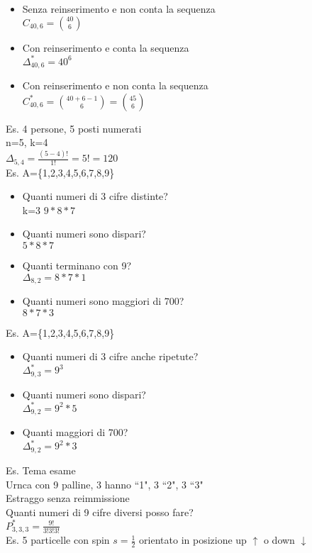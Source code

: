 \documentclass{report}
\begin{document}
\begin{itemize}
\begin{itemize}
      \item Senza reinserimento e non conta la sequenza\\$C_{40,6} = \binom{40}{6}$
      \item Con reinserimento e conta la sequenza\\$\Delta_{40,6}^* = 40^6$
      \item Con reinserimento e non conta la sequenza\\$C_{40,6}^* = \binom{40+6-1}{6}=\binom{45}{6}$
    \end{itemize}
    Es. 4 persone, 5 posti numerati\\
    n=5, k=4\\
    $\Delta_{5,4}=\frac{(5-4)!}{1!} = 5! = 120$\\
    Es. A=\{1,2,3,4,5,6,7,8,9\} \\
    \begin{itemize}
      \item Quanti numeri di 3 cifre distinte?\\k=3 $9*8*7$
      \item Quanti numeri sono dispari?\\$5*8*7$
      \item Quanti terminano con 9?\\$\Delta_{8,2}=8*7*1$
      \item Quanti numeri sono maggiori di 700?\\$8*7*3$
    \end{itemize}
    Es. A=\{1,2,3,4,5,6,7,8,9\}
    \begin{itemize}
      \item Quanti numeri di 3 cifre anche ripetute?\\$\Delta_{9,3}^* = 9^3$
      \item Quanti numeri sono dispari?\\$\Delta_{9,2}^* = 9^2*5$
      \item Quanti maggiori di 700?\\$\Delta_{9,2}^* = 9^2*3$
      \end{itemize}
      Es. Tema esame\\
      Urnca con 9 palline, 3 hanno ``1", 3 ``2", 3 ``3"\\
      Estraggo senza reimmissione\\
      Quanti numeri di 9 cifre diversi posso fare?\\
      $P_{3,3,3}^* = \frac{9!}{3!3!3!}$\\
      Es. 5 particelle con spin $s=\frac{1}{2}$ orientato in posizione up $\uparrow$ o down $\downarrow$\\

\end{itemize}
\end{document}
